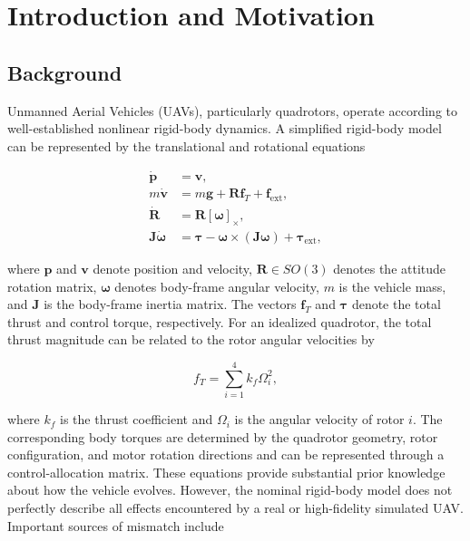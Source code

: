 \documentclass[conference]{IEEEtran}
\begin{document}
\section{Introduction and Motivation}

\subsection{Background}

Unmanned Aerial Vehicles (UAVs), particularly quadrotors, operate
according to well-established nonlinear rigid-body dynamics. A
simplified rigid-body model can be represented by the translational and
rotational equations

\begin{align}
\dot{\mathbf{p}} &= \mathbf{v}, \\
m\dot{\mathbf{v}}
&=
m\mathbf{g}
+
\mathbf{R}\mathbf{f}_{T}
+
\mathbf{f}_{\mathrm{ext}}, \\
\dot{\mathbf{R}}
&=
\mathbf{R}[\boldsymbol{\omega}]_{\times}, \\
\mathbf{J}\dot{\boldsymbol{\omega}}
&=
\boldsymbol{\tau}
-
\boldsymbol{\omega}
\times
(\mathbf{J}\boldsymbol{\omega})
+
\boldsymbol{\tau}_{\mathrm{ext}},
\end{align}

where $\mathbf{p}$ and $\mathbf{v}$ denote position and velocity,
$\mathbf{R}\in SO(3)$ denotes the attitude rotation matrix,
$\boldsymbol{\omega}$ denotes body-frame angular velocity, $m$ is the
vehicle mass, and $\mathbf{J}$ is the body-frame inertia matrix.
The vectors $\mathbf{f}_{T}$ and $\boldsymbol{\tau}$ denote the total
thrust and control torque, respectively. For an idealized quadrotor, the total thrust magnitude can be related
to the rotor angular velocities by

\begin{equation}
f_T = \sum_{i=1}^{4} k_f \Omega_i^2,
\end{equation}


where $k_f$ is the thrust coefficient and $\Omega_i$ is the angular
velocity of rotor $i$. The corresponding body torques are determined
by the quadrotor geometry, rotor configuration, and motor rotation
directions and can be represented through a control-allocation matrix. These equations provide substantial prior knowledge about how the
vehicle evolves. However, the nominal rigid-body model does not
perfectly describe all effects encountered by a real or high-fidelity
simulated UAV. Important sources of mismatch include
\end{document}
